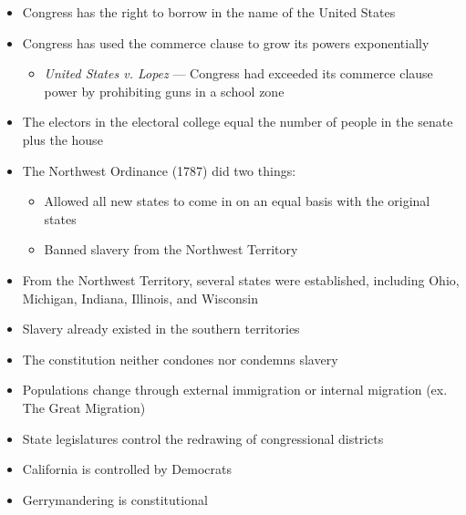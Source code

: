 \documentclass[12pt]{article}
\begin{document}
\begin{itemize}
  \item Congress has the right to borrow in the name of the United States

  \item Congress has used the commerce clause to grow its powers exponentially

    \begin{itemize}

      \item \textit{United States v. Lopez} — Congress had exceeded its commerce clause power by prohibiting guns in a school zone

    \end{itemize}

  \item The electors in the electoral college equal the number of people in the senate plus the house

  \item The Northwest Ordinance (1787) did two things:

    \begin{itemize}

      \item Allowed all new states to come in on an equal basis with the original states

      \item Banned slavery from the Northwest Territory

    \end{itemize}

  \item From the Northwest Territory, several states were established, including Ohio, Michigan, Indiana, Illinois, and Wisconsin

  \item Slavery already existed in the southern territories

  \item The constitution neither condones nor condemns slavery

  \item Populations change through external immigration or internal migration (ex. The Great Migration)

  \item State legislatures control the redrawing of congressional districts

  \item California is controlled by Democrats

  \item Gerrymandering is constitutional


\end{itemize}
\end{document}

